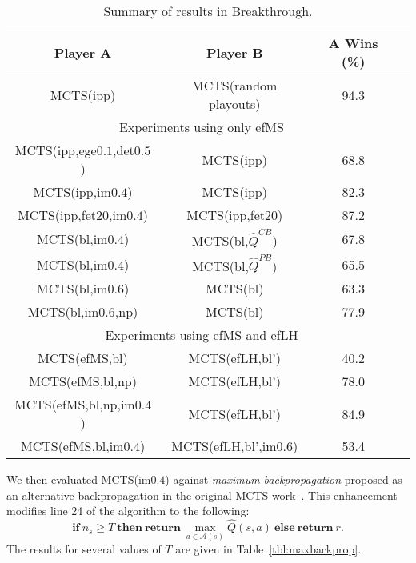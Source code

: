 \documentclass{article}
\newcommand{\cA}{\mathcal{A}}
\newcommand{\hQ}{\hat{Q}}
\begin{document}
\begin{table}[t]
\begin{center}
\begin{tabular}{|c|c|c|c|}
\hline
{\bf Player A}              & {\bf Player B}         & {\bf A Wins} (\%)  \\
\hline
MCTS(ipp)                   & MCTS(random playouts)  & 94.3               \\
\hline 
\hline 
\multicolumn{3}{|c|}{Experiments using only efMS}  \\ 
\hline
MCTS(ipp,ege$0.1$,det$0.5$) & MCTS(ipp)              & 68.8               \\
MCTS(ipp,im$0.4$)           & MCTS(ipp)              & 82.3               \\ 
MCTS(ipp,fet$20$,im$0.4$)   & MCTS(ipp,fet$20$)      & 87.2               \\
MCTS(bl,im$0.4$)            & MCTS(bl,$\hQ^{CB}$)    & 67.8               \\
MCTS(bl,im$0.4$)            & MCTS(bl,$\hQ^{PB}$)    & 65.5               \\
MCTS(bl,im$0.6$)            & MCTS(bl)               & 63.3               \\
MCTS(bl,im$0.6$,np)         & MCTS(bl)               & 77.9               \\
\hline
\hline
\multicolumn{3}{|c|}{Experiments using efMS and efLH}  \\ 
\hline
MCTS(efMS,bl)               & MCTS(efLH,bl')         & 40.2               \\
MCTS(efMS,bl,np)            & MCTS(efLH,bl')         & 78.0               \\
MCTS(efMS,bl,np,im$0.4$)    & MCTS(efLH,bl')         & 84.9               \\ 
MCTS(efMS,bl,im$0.4$)       & MCTS(efLH,bl',im$0.6$) & 53.4               \\
\hline
\end{tabular}
\end{center}
\caption{Summary of results in Breakthrough.}
\label{tbl:btsummary}
\end{table}


We then evaluated MCTS(im$0.4$) against {\it maximum backpropagation} proposed as an alternative 
backpropagation in the original MCTS work~\cite{Coulom06Efficient}. This enhancement
modifies line 24 of the algorithm to the following: 
\[
\mathbf{if}~n_{s} \ge T~\mathbf{then~return}~\max_{a \in \cA(s)} \hQ(s,a)~\mathbf{else~return}~r.
\]
The results for several values of $T$ are given in Table~\ref{tbl:maxbackprop}. 
\end{document}
